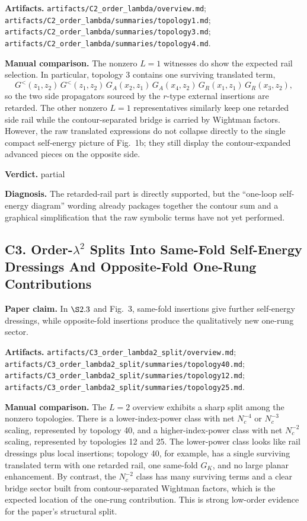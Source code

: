 \documentclass[11pt]{article}
\begin{document}
\textbf{Artifacts.} \texttt{artifacts/C2\_order\_lambda/overview.md}; \texttt{artifacts/C2\_order\_lambda/summaries/topology1.md}; \texttt{artifacts/C2\_order\_lambda/summaries/topology3.md}; \texttt{artifacts/C2\_order\_lambda/summaries/topology4.md}.

\textbf{Manual comparison.} The nonzero $L=1$ witnesses do show the expected rail selection. In particular, topology 3 contains one surviving translated term,
\[
G^<(z_1,z_2)\,G^<(z_1,z_2)\,G_A(x_2,z_1)\,G_A(x_4,z_2)\,G_R(x_1,z_1)\,G_R(x_3,z_2),
\]
so the two side propagators sourced by the $r$-type external insertions are retarded. The other nonzero $L=1$ representatives similarly keep one retarded side rail while the contour-separated bridge is carried by Wightman factors. However, the raw translated expressions do not collapse directly to the single compact self-energy picture of Fig.~1b; they still display the contour-expanded advanced pieces on the opposite side.

\textbf{Verdict.} partial

\textbf{Diagnosis.} The retarded-rail part is directly supported, but the ``one-loop self-energy diagram'' wording already packages together the contour sum and a graphical simplification that the raw symbolic terms have not yet performed.

\subsection*{C3. Order-$\lambda^2$ Splits Into Same-Fold Self-Energy Dressings And Opposite-Fold One-Rung Contributions}
\textbf{Paper claim.} In $\S 2.3$ and Fig.~3, same-fold insertions give further self-energy dressings, while opposite-fold insertions produce the qualitatively new one-rung sector.

\textbf{Artifacts.} \texttt{artifacts/C3\_order\_lambda2\_split/overview.md}; \texttt{artifacts/C3\_order\_lambda2\_split/summaries/topology40.md}; \texttt{artifacts/C3\_order\_lambda2\_split/summaries/topology12.md}; \texttt{artifacts/C3\_order\_lambda2\_split/summaries/topology25.md}.

\textbf{Manual comparison.} The $L=2$ overview exhibits a sharp split among the nonzero topologies. There is a lower-index-power class with net $N_c^{-4}$ or $N_c^{-3}$ scaling, represented by topology 40, and a higher-index-power class with net $N_c^{-2}$ scaling, represented by topologies 12 and 25. The lower-power class looks like rail dressings plus local insertions; topology 40, for example, has a single surviving translated term with one retarded rail, one same-fold $G_K$, and no large planar enhancement. By contrast, the $N_c^{-2}$ class has many surviving terms and a clear bridge sector built from contour-separated Wightman factors, which is the expected location of the one-rung contribution. This is strong low-order evidence for the paper's structural split.
\end{document}
